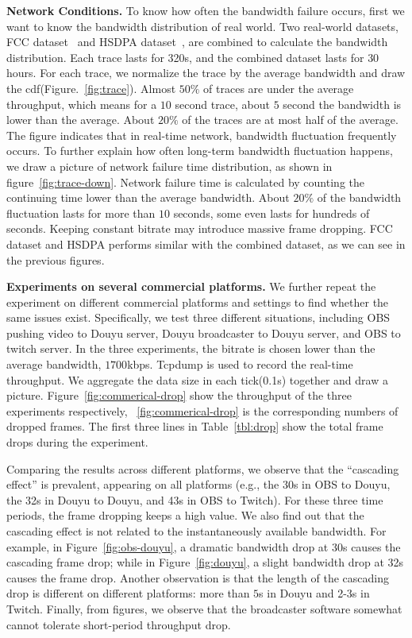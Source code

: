 
\textbf{Network Conditions.} To know how often the bandwidth failure occurs, first we want to know the bandwidth distribution of real world. Two real-world datasets, FCC dataset~\cite{FCC_dataset} and HSDPA dataset~\cite{HSDPA_dataset}, are combined to calculate the bandwidth distribution. Each trace lasts for 320s, and the combined dataset lasts for $30$ hours. For each trace, we normalize the trace by the average bandwidth and draw the cdf(Figure.~\ref{fig:trace}). Almost $50\%$ of traces are under the average throughput, which means for a $10$ second trace, about $5$ second the bandwidth is lower than the average. About $20\%$ of the traces are at most half of the average. The figure indicates that in real-time network, bandwidth fluctuation frequently occurs. To further explain how often long-term bandwidth fluctuation happens, we draw a picture of network failure time distribution, as shown in figure~\ref{fig:trace-down}. Network failure time is calculated by counting the continuing time lower than the average bandwidth. About $20\%$ of the bandwidth fluctuation lasts for more than $10$ seconds, some even lasts for hundreds of seconds. Keeping constant bitrate may introduce massive frame dropping. FCC dataset and HSDPA performs similar with the combined dataset, as we can see in the previous figures.


\textbf{Experiments on several commercial platforms.} We further repeat the experiment on different commercial platforms and settings to find whether the same issues exist.  Specifically, we test three different situations, including OBS pushing video to Douyu server, Douyu broadcaster to Douyu server, and OBS to twitch server. In the three experiments, the bitrate is chosen lower than the average bandwidth, $1700$kbps. Tcpdump is used to record the real-time throughput. We aggregate the data size in each tick(0.1s) together and draw a picture.
Figure~\ref{fig:commerical-drop} show the throughput of the three experiments respectively, ~\ref{fig:commerical-drop} is the corresponding numbers of dropped frames. The first three lines in Table~\ref{tbl:drop} show the total frame drops during the experiment.

Comparing the results across different platforms, we observe that the ``cascading effect'' is prevalent, appearing on all platforms (e.g., the 30s in OBS to Douyu, the 32s in Douyu to Douyu, and 43s in OBS to Twitch). For these three time periods, the frame dropping keeps a high value. We also find out that the cascading effect is not related to the instantaneously available bandwidth. For example, in Figure~\ref{fig:obs-douyu}, a dramatic bandwidth drop at 30s causes the cascading frame drop; while in Figure~\ref{fig:douyu}, a slight bandwidth drop at 32s causes the frame drop. Another observation is that the length of the cascading drop is different on different platforms: more than $5$s in Douyu and 2-3s in Twitch. Finally, from figures, we observe that the broadcaster software somewhat cannot tolerate short-period throughput drop.

